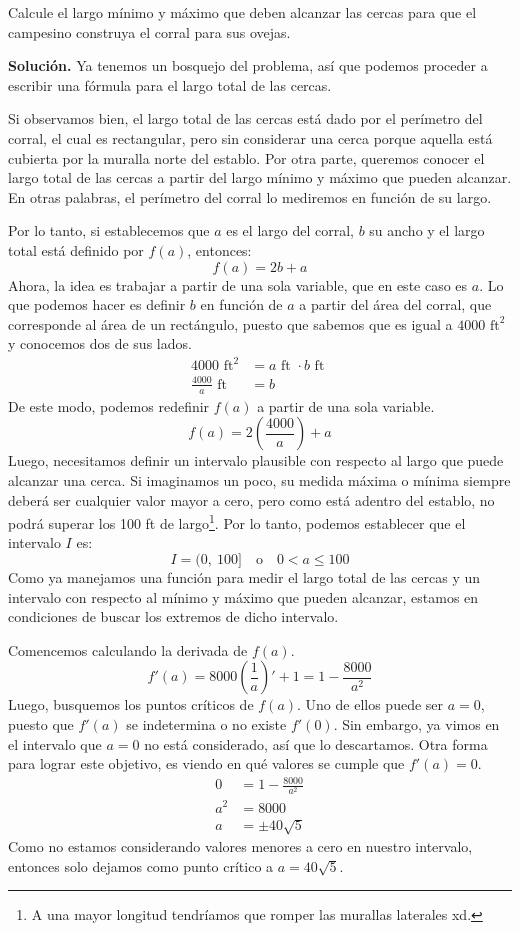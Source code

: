 \documentclass[12pt]{article}
\begin{document}
Calcule el largo mínimo y máximo que deben alcanzar las cercas para que el campesino construya el corral para sus ovejas.

\newpage

\textbf{Solución.} \quad Ya tenemos un bosquejo del problema, así que podemos proceder a escribir una fórmula para el largo total de las cercas.

Si observamos bien, el largo total de las cercas está dado por el perímetro del corral, el cual es rectangular, pero sin considerar una cerca porque aquella está cubierta por la muralla norte del establo. Por otra parte, queremos conocer el largo total de las cercas a partir del largo mínimo y máximo que pueden alcanzar. En otras palabras, el perímetro del corral lo mediremos en función de su largo.

Por lo tanto, si establecemos que $a$ es el largo del corral, $b$ su ancho y el largo total está definido por $f(a)$, entonces:
\[
	f(a) = 2b + a
\]
Ahora, la idea es trabajar a partir de una sola variable, que en este caso es $a$. Lo que podemos hacer es definir $b$ en función de $a$ a partir del área del corral, que corresponde al área de un rectángulo, puesto que sabemos que es igual a $4000 \text{ ft}^{2}$ y conocemos dos de sus lados.
\begin{align*}
4000 \text{ ft}^{2} &= a \text{ ft } \cdot b \text{ ft } \\
\frac{4000}{a} \text{ ft} &= b
\end{align*}
De este modo, podemos redefinir $f(a)$ a partir de una sola variable.
\[
	f(a) = 2\left(\frac{4000}{a}\right) + a
\]
Luego, necesitamos definir un intervalo plausible con respecto al largo que puede alcanzar una cerca. Si imaginamos un poco, su medida máxima o mínima siempre deberá ser cualquier valor mayor a cero, pero como está adentro del establo, no podrá superar los 100 ft de largo\footnote{A una mayor longitud tendríamos que romper las murallas laterales xd.}. Por lo tanto, podemos establecer que el intervalo $I$ es:
\[
	I = (0, \ 100] \quad \text{o} \quad 0 < a \leq 100
\]
Como ya manejamos una función para medir el largo total de las cercas y un intervalo con respecto al mínimo y máximo que pueden alcanzar, estamos en condiciones de buscar los extremos de dicho intervalo.

\newpage

Comencemos calculando la derivada de $f(a)$.
\[
	f'(a) = 8000\left(\frac{1}{a}\right)' + 1
		  = 1 - \frac{8000}{a^{2}}
\]
Luego, busquemos los puntos críticos de $f(a)$. Uno de ellos puede ser $a = 0$, puesto que $f'(a)$ se indetermina o no existe $f'(0)$. Sin embargo, ya vimos en el intervalo que $a = 0$ no está considerado, así que lo descartamos. Otra forma para lograr este objetivo, es viendo en qué valores se cumple que $f'(a) = 0$.
\begin{align*}
0 &= 1 - \frac{8000}{a^{2}} \\
a^{2} &= 8000 \\
a &= \pm 40\sqrt{5}
\end{align*}
Como no estamos considerando valores menores a cero en nuestro intervalo, entonces solo dejamos como punto crítico a $a = 40\sqrt{5}$.
\end{document}
